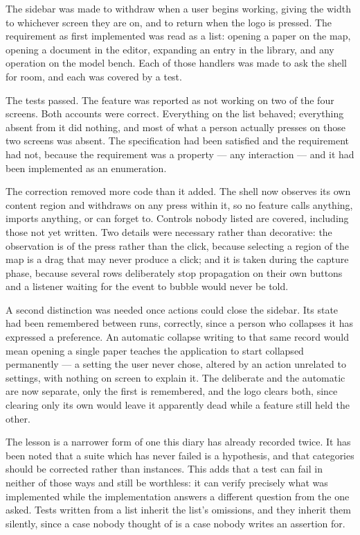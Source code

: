 \documentclass[11pt,a4paper]{article}
\begin{document}
The sidebar was made to withdraw when a user begins working, giving the width
to whichever screen they are on, and to return when the logo is pressed. The
requirement as first implemented was read as a list: opening a paper on the map,
opening a document in the editor, expanding an entry in the library, and any
operation on the model bench. Each of those handlers was made to ask the shell
for room, and each was covered by a test.

The tests passed. The feature was reported as not working on two of the four
screens. Both accounts were correct. Everything on the list behaved; everything
absent from it did nothing, and most of what a person actually presses on those
two screens was absent. The specification had been satisfied and the requirement
had not, because the requirement was a property --- any interaction --- and it
had been implemented as an enumeration.

The correction removed more code than it added. The shell now observes its own
content region and withdraws on any press within it, so no feature calls
anything, imports anything, or can forget to. Controls nobody listed are covered,
including those not yet written. Two details were necessary rather than
decorative: the observation is of the press rather than the click, because
selecting a region of the map is a drag that may never produce a click; and it
is taken during the capture phase, because several rows deliberately stop
propagation on their own buttons and a listener waiting for the event to bubble
would never be told.

A second distinction was needed once actions could close the sidebar. Its state
had been remembered between runs, correctly, since a person who collapses it has
expressed a preference. An automatic collapse writing to that same record would
mean opening a single paper teaches the application to start collapsed
permanently --- a setting the user never chose, altered by an action unrelated to
settings, with nothing on screen to explain it. The deliberate and the automatic
are now separate, only the first is remembered, and the logo clears both, since
clearing only its own would leave it apparently dead while a feature still held
the other.

The lesson is a narrower form of one this diary has already recorded twice. It
has been noted that a suite which has never failed is a hypothesis, and that
categories should be corrected rather than instances. This adds that a test can
fail in neither of those ways and still be worthless: it can verify precisely
what was implemented while the implementation answers a different question from
the one asked. Tests written from a list inherit the list's omissions, and they
inherit them silently, since a case nobody thought of is a case nobody writes an
assertion for.
\end{document}
